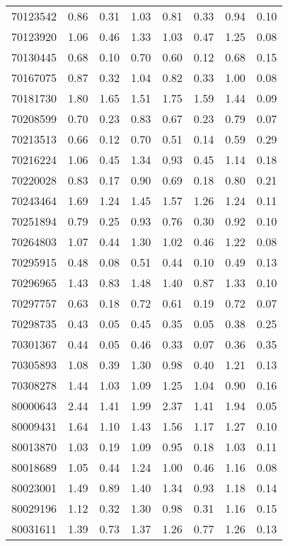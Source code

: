 \begin{longtable}{|c|c c c|c c c|c|}
70123542 & 0.86 & 0.31 & 1.03 & 0.81 & 0.33 & 0.94 & 0.10 \\
70123920 & 1.06 & 0.46 & 1.33 & 1.03 & 0.47 & 1.25 & 0.08 \\
70130445 & 0.68 & 0.10 & 0.70 & 0.60 & 0.12 & 0.68 & 0.15 \\
70167075 & 0.87 & 0.32 & 1.04 & 0.82 & 0.33 & 1.00 & 0.08 \\
70181730 & 1.80 & 1.65 & 1.51 & 1.75 & 1.59 & 1.44 & 0.09 \\
70208599 & 0.70 & 0.23 & 0.83 & 0.67 & 0.23 & 0.79 & 0.07 \\
\rowcolor{lightgray}70213513 & 0.66 & 0.12 & 0.70 & 0.51 & 0.14 & 0.59 & 0.29 \\
70216224 & 1.06 & 0.45 & 1.34 & 0.93 & 0.45 & 1.14 & 0.18 \\
70220028 & 0.83 & 0.17 & 0.90 & 0.69 & 0.18 & 0.80 & 0.21 \\
70243464 & 1.69 & 1.24 & 1.45 & 1.57 & 1.26 & 1.24 & 0.11 \\
70251894 & 0.79 & 0.25 & 0.93 & 0.76 & 0.30 & 0.92 & 0.10 \\
70264803 & 1.07 & 0.44 & 1.30 & 1.02 & 0.46 & 1.22 & 0.08 \\
70295915 & 0.48 & 0.08 & 0.51 & 0.44 & 0.10 & 0.49 & 0.13 \\
70296965 & 1.43 & 0.83 & 1.48 & 1.40 & 0.87 & 1.33 & 0.10 \\
70297757 & 0.63 & 0.18 & 0.72 & 0.61 & 0.19 & 0.72 & 0.07 \\
\rowcolor{lightgray}70298735 & 0.43 & 0.05 & 0.45 & 0.35 & 0.05 & 0.38 & 0.25 \\
\rowcolor{lightgray}70301367 & 0.44 & 0.05 & 0.46 & 0.33 & 0.07 & 0.36 & 0.35 \\
70305893 & 1.08 & 0.39 & 1.30 & 0.98 & 0.40 & 1.21 & 0.13 \\
70308278 & 1.44 & 1.03 & 1.09 & 1.25 & 1.04 & 0.90 & 0.16 \\
80000643 & 2.44 & 1.41 & 1.99 & 2.37 & 1.41 & 1.94 & 0.05 \\
80009431 & 1.64 & 1.10 & 1.43 & 1.56 & 1.17 & 1.27 & 0.10 \\
80013870 & 1.03 & 0.19 & 1.09 & 0.95 & 0.18 & 1.03 & 0.11 \\
80018689 & 1.05 & 0.44 & 1.24 & 1.00 & 0.46 & 1.16 & 0.08 \\
80023001 & 1.49 & 0.89 & 1.40 & 1.34 & 0.93 & 1.18 & 0.14 \\
80029196 & 1.12 & 0.32 & 1.30 & 0.98 & 0.31 & 1.16 & 0.15 \\
80031611 & 1.39 & 0.73 & 1.37 & 1.26 & 0.77 & 1.26 & 0.13 \\

\end{longtable}
